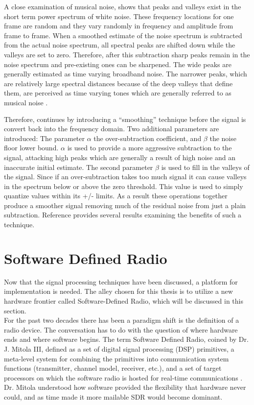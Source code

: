 A close examination of musical noise, shows that peaks and valleys exist in the short term power spectrum of white noise.  These frequency locations for one frame are random and they vary randomly in frequency and amplitude from frame to frame. When a smoothed estimate of the noise spectrum is subtracted from the actual noise spectrum, all spectral peaks are shifted down while the valleys are set to zero. Therefore, after this subtraction sharp peaks remain in the noise spectrum and pre-existing ones can be sharpened. The wide peaks are generally estimated as time varying broadband noise. The narrower peaks, which are relatively large spectral distances because of the deep valleys that define them, are perceived as time varying tones which are generally referred to as musical noise \cite{berouti}.

Therefore, \cite{boll} continues by introducing a ``smoothing'' technique before the signal is convert back into the frequency domain.  Two additional parameters are introduced: The parameter \( \alpha \) the over-subtraction coefficient, and \(\beta\) the noise floor lower bound.  \(\alpha\) is used to provide a more aggressive subtraction to the signal, attacking high peaks which are generally a result of high noise and an inaccurate initial estimate.  The second parameter \(\beta\) is used to fill in the valleys of the signal.  Since if an over-subtraction takes too much signal it can cause valleys in the spectrum below or above the zero threshold.  This value is used to simply quantize values within its +/- limits.  As a result these operations together produce a smoother signal removing much of the residual noise from just a plain subtraction.  Reference \cite{boll} provides several results examining the benefits of such a technique.\\  


\section{Software Defined Radio}

Now that the signal processing techniques have been discussed, a platform for implementation is needed.  The alley chosen for this thesis is to utilize a new hardware frontier called Software-Defined Radio, which will be discussed in this section.\\

For the past two decades there has been a paradigm shift is the definition of a radio device.  The conversation has to do with the question of where hardware ends and where software begins.  The term Software Defined Radio, coined by Dr. J. Mitola III,  defined as a set of digital signal processing (DSP) primitives, a meta-level system for combining the primitives into communication system functions (transmitter, channel model, receiver, etc.), and a set of target processors on which the software radio is hosted for real-time communications \cite{21}.  Dr. Mitola understood how software provided the flexibility that hardware never could, and as time made it more mailable SDR would become dominant.\\

